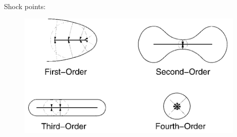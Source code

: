 \documentclass[notheorems,serif,table,compress]{beamer}  %
\begin{document}
\begin{frame}
\begin{figure}
\begin{minipage}[t]{0.3\linewidth}
              \end{minipage}
            \end{figure}
{\color{blue}Shock points}: %
            \begin{figure}
              \centering
              \includegraphics[width=0.4\linewidth]{shock1} 
            \end{figure}
\end{frame}

\end{document}

